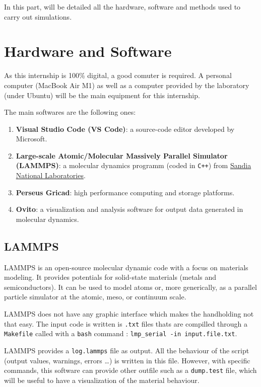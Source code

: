 
In this part, will be detailed all the hardware, software and methods used to carry out simulations. 

\section{Hardware and Software}

    As this internship is 100\% digital, a good comuter is required. A personal computer (MacBook Air M1) as well as a computer provided by the laboratory (under Ubuntu) will be the main equipment for this internship. \medskip

    The main softwares are the following ones:

    \begin{enumerate}[\hspace{3em}$\bullet$]
        \item \textbf{Visual Studio Code (VS Code)}: a source-code editor developed by Microsoft.
        \item \textbf{Large-scale Atomic/Molecular Massively Parallel Simulator (LAMMPS)}: a molecular dynamics programm (coded in \verb|C++|) from \href{http://www.sandia.gov}{Sandia National Laboratories}.
        \item \textbf{Perseus Gricad}: high performance computing and storage platforms.  
        \item \textbf{Ovito}: a visualization and analysis software for output data generated in molecular dynamics. 
    \end{enumerate}

    \subsection{LAMMPS}

        LAMMPS is an open-source molecular dynamic code with a focus on materials modeling. It provides potentials for solid-state materials (metals and semiconductors). It can be used to model atoms or, more generically, as a parallel particle simulator at the atomic, meso, or continuum scale. \medskip

        LAMMPS does not have any graphic interface which makes the handholding not that easy. The input code is written is \verb|.txt| files thats are compilled through a \verb|Makefile| called with a \verb|bash| command : \verb|lmp_serial -in input.file.txt|.
        
        LAMMPS provides a \verb|log.lammps| file as output. All the behaviour of the script (output values, warnings, errors \dots) is written in this file. However, with specific commands, this software can provide other outfile such as a \verb|dump.test| file, which will be useful to have a visualization of the material behaviour. \medskip

